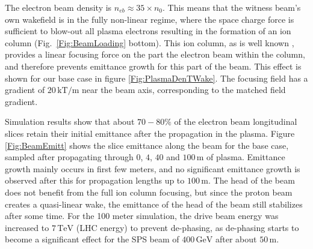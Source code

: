 \documentclass[aps,prstab,reprint,amsmath,amssymb,groupedaddress]{revtex4-1}
\newcommand{\unit}[1]{\,\mathrm{#1}}
\begin{document}
The %
electron beam density is $n_{eb} \approx 35\times n_{0}$. This means that the witness beam's own wakefield is in the
fully non-linear regime, where the space charge force is sufficient to blow-out all plasma electrons resulting in the
formation of an ion column %
(Fig.~\ref{Fig:BeamLoading} bottom). This ion column, as is well known \cite{rosenzweig:1991}, provides a linear
focusing force on the part the electron beam within the column, and therefore prevents emittance growth for this %
part of the beam.  This effect is shown for our base case in figure \ref{Fig:PlasmaDenTWake}. The focusing field has a
gradient of $20\unit{kT/m}$ near the beam axis, corresponding to the matched field gradient.


Simulation results show that about $70-80\%$ of the electron beam longitudinal slices retain their initial emittance
after the propagation in the plasma. Figure \ref{Fig:BeamEmitt} shows the slice emittance along the beam for the base
case, sampled after propagating through $0$, $4$, $40$ and $100\unit{m}$ of plasma. Emittance growth mainly occurs in
first few meters, and no significant emittance growth %
is observed after this for propagation lengths up to $100\unit{m}$. The head of the beam does not benefit from the full
ion column focusing, but since the proton beam creates a quasi-linear wake, the emittance of the head of the beam still
stabilizes after some time. For the 100 meter simulation, the drive beam energy was increased to $7\unit{TeV}$
(LHC energy) to prevent de-phasing, as de-phasing starts to become a significant effect for the SPS beam of
$400\unit{GeV}$ after about $50\unit{m}$.
\end{document}
